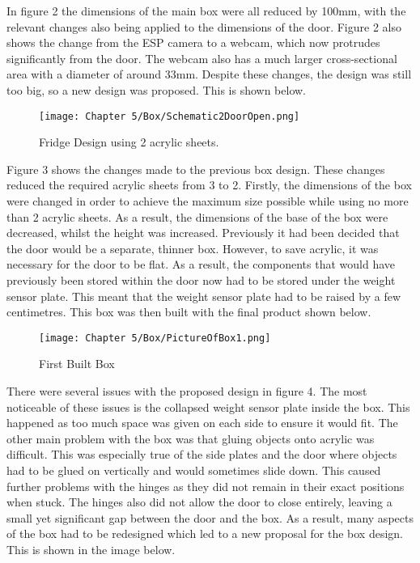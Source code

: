 In figure 2 the dimensions of the main box were all reduced by 100mm, with the relevant changes also being applied to the dimensions of the door.
Figure 2 also shows the change from the ESP camera to a webcam, which now protrudes significantly from the door.
The webcam also has a much larger cross-sectional area with a diameter of around 33mm.
Despite these changes, the design was still too big, so a new design was proposed.
This is shown below.

\begin{figure}[H]        
    \centering
    \texttt{[image: Chapter 5/Box/Schematic2DoorOpen.png]}
    \caption{Fridge Design using 2 acrylic sheets.}
    \label{fig:fridge2sheet}
\end{figure} 

Figure 3 shows the changes made to the previous box design.
These changes reduced the required acrylic sheets from 3 to 2.
Firstly, the dimensions of the box were changed in order to achieve the maximum size possible while using no more than 2 acrylic sheets.
As a result, the dimensions of the base of the box were decreased, whilst the height was increased.
Previously it had been decided that the door would be a separate, thinner box.
However, to save acrylic, it was necessary for the door to be flat.
As a result, the components that would have previously been stored within the door now had to be stored under the weight sensor plate.
This meant that the weight sensor plate had to be raised by a few centimetres.
This box was then built with the final product shown below.

\begin{figure}[H]        
    \centering
    \texttt{[image: Chapter 5/Box/PictureOfBox1.png]}
    \caption{First Built Box}
    \label{fig:firstbuilt}
\end{figure} 

There were several issues with the proposed design in figure 4.
The most noticeable of these issues is the collapsed weight sensor plate inside the box.
This happened as too much space was given on each side to ensure it would fit.
The other main problem with the box was that gluing objects onto acrylic was difficult.
This was especially true of the side plates and the door where objects had to be glued on vertically and would sometimes slide down.
This caused further problems with the hinges as they did not remain in their exact positions when stuck.
The hinges also did not allow the door to close entirely, leaving a small yet significant gap between the door and the box.
As a result, many aspects of the box had to be redesigned which led to a new proposal for the box design.
This is shown in the image below.

